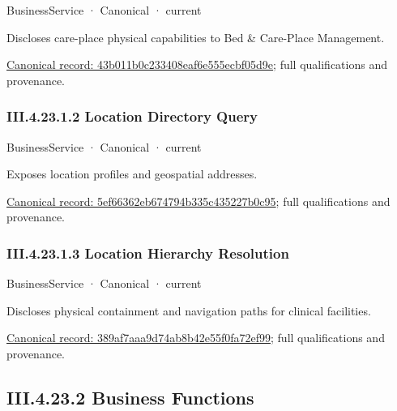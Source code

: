 \label{element:43b011b0c233408eaf6e555ecbf05d9e}
{\small BusinessService · Canonical · current}\par

Discloses care-place physical capabilities to Bed \& Care-Place Management.


{\footnotesize \href{../../../../continuum/business/business-service/43b011b0c233408eaf6e555ecbf05d9e.md}{Canonical record: 43b011b0c233408eaf6e555ecbf05d9e}; full qualifications and provenance.}\par
\subsubsection*{III.4.23.1.2 Location Directory Query}
\label{navigation:III.4.23.1.2}

\label{element:5ef66362eb674794b335c435227b0c95}
{\small BusinessService · Canonical · current}\par

Exposes location profiles and geospatial addresses.


{\footnotesize \href{../../../../continuum/business/business-service/5ef66362eb674794b335c435227b0c95.md}{Canonical record: 5ef66362eb674794b335c435227b0c95}; full qualifications and provenance.}\par
\subsubsection*{III.4.23.1.3 Location Hierarchy Resolution}
\label{navigation:III.4.23.1.3}

\label{element:389af7aaa9d74ab8b42e55f0fa72ef99}
{\small BusinessService · Canonical · current}\par

Discloses physical containment and navigation paths for clinical facilities.


{\footnotesize \href{../../../../continuum/business/business-service/389af7aaa9d74ab8b42e55f0fa72ef99.md}{Canonical record: 389af7aaa9d74ab8b42e55f0fa72ef99}; full qualifications and provenance.}\par
\subsection*{III.4.23.2 Business Functions}
\label{navigation:III.4.23.2}

